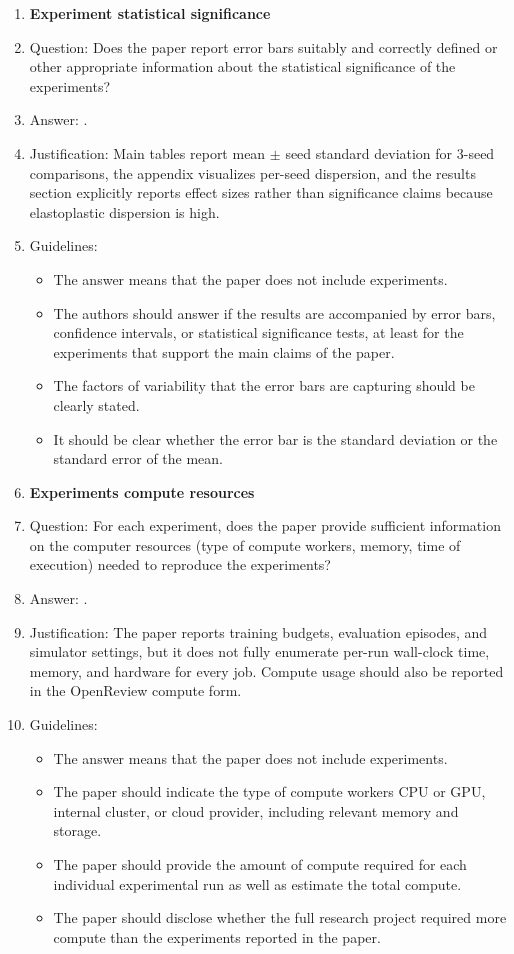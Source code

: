 \begin{enumerate}
\item {\bf Experiment statistical significance}
    \item[] Question: Does the paper report error bars suitably and correctly defined or other appropriate information about the statistical significance of the experiments?
    \item[] Answer: \answerYes{}.
    \item[] Justification: Main tables report mean $\pm$ seed standard deviation for 3-seed comparisons, the appendix visualizes per-seed dispersion, and the results section explicitly reports effect sizes rather than significance claims because elastoplastic dispersion is high.
    \item[] Guidelines:
    \begin{itemize}
        \item The answer \answerNA{} means that the paper does not include experiments.
        \item The authors should answer \answerYes{} if the results are accompanied by error bars, confidence intervals, or statistical significance tests, at least for the experiments that support the main claims of the paper.
        \item The factors of variability that the error bars are capturing should be clearly stated.
        \item It should be clear whether the error bar is the standard deviation or the standard error of the mean.
    \end{itemize}

\item {\bf Experiments compute resources}
    \item[] Question: For each experiment, does the paper provide sufficient information on the computer resources (type of compute workers, memory, time of execution) needed to reproduce the experiments?
    \item[] Answer: \answerNo{}.
    \item[] Justification: The paper reports training budgets, evaluation episodes, and simulator settings, but it does not fully enumerate per-run wall-clock time, memory, and hardware for every job. Compute usage should also be reported in the OpenReview compute form.
    \item[] Guidelines:
    \begin{itemize}
        \item The answer \answerNA{} means that the paper does not include experiments.
        \item The paper should indicate the type of compute workers CPU or GPU, internal cluster, or cloud provider, including relevant memory and storage.
        \item The paper should provide the amount of compute required for each individual experimental run as well as estimate the total compute.
        \item The paper should disclose whether the full research project required more compute than the experiments reported in the paper.
    \end{itemize}


\end{enumerate}
